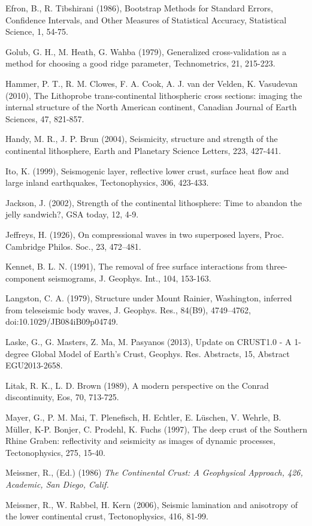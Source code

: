 \documentclass[draft, 12pt]{article}
\begin{document}
Efron, B., R. Tibshirani (1986), Bootstrap Methods for Standard Errors, Confidence Intervals, and Other Measures of Statistical Accuracy, Statistical Science, 1, 54-75.

Golub, G. H., M. Heath, G. Wahba (1979), Generalized cross-validation as a method for choosing a good ridge parameter, Technometrics, 21, 215-223.

Hammer, P. T., R. M. Clowes, F. A. Cook, A. J. van der Velden, K. Vasudevan (2010), The Lithoprobe trans-continental lithospheric cross sections: imaging the internal structure of the North American continent, Canadian Journal of Earth Sciences, 47, 821-857.

Handy, M. R.,  J. P. Brun (2004), Seismicity, structure and strength of the continental lithosphere, Earth and Planetary Science Letters, 223, 427-441.

Ito, K. (1999), Seismogenic layer, reflective lower crust, surface heat flow and large inland earthquakes, Tectonophysics, 306, 423-433.

Jackson, J. (2002), Strength of the continental lithosphere: Time to abandon the jelly sandwich?, GSA today, 12, 4-9.

Jeffreys, H. (1926), On compressional waves in two superposed layers, Proc. Cambridge Philos. Soc., 23, 472–481.

Kennet, B. L. N. (1991), The removal of free surface interactions from three-component seismograms, J. Geophys. Int., 104, 153-163.

Langston, C. A. (1979), Structure under Mount Rainier, Washington, inferred from teleseismic body waves, J. Geophys. Res., 84(B9), 4749–4762, doi:10.1029/JB084iB09p04749.

Laske, G., G. Masters, Z. Ma, M. Pasyanos (2013), Update on CRUST1.0 - A 1-degree Global Model of Earth's Crust, Geophys. Res. Abstracts, 15, Abstract EGU2013-2658.

Litak, R. K., L. D. Brown (1989), A modern perspective on the Conrad discontinuity, Eos, 70, 713-725.

Mayer, G., P. M. Mai, T. Plenefisch, H. Echtler, E. Lüschen, V. Wehrle, B. Müller, K-P. Bonjer, C. Prodehl, K. Fuchs (1997), The deep crust of the Southern Rhine Graben: reflectivity and seismicity as images of dynamic processes, Tectonophysics, 275, 15-40.

Meissner, R., (Ed.) (1986) \it{The Continental Crust: A Geophysical Approach}, 426, Academic, San Diego, Calif.

Meissner, R., W. Rabbel, H. Kern (2006), Seismic lamination and anisotropy of the lower continental crust, Tectonophysics, 416, 81-99.
\end{document}
